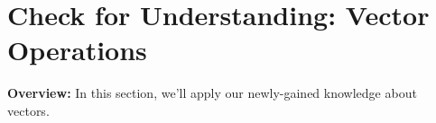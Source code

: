 \section{Check for Understanding: Vector Operations}

\begin{overview}

\textbf{Overview:} In this section, we'll apply our newly-gained knowledge about vectors.

\end{overview}

\label{act6.1.3}

\begin{fnt}
	
\end{fnt}

\vspace{-10pt}
\WCD
\vspace{3pt}

\begin{fnt}
	
\end{fnt}

\vspace{-10pt}
\WCD

\begin{fnt}
	
\end{fnt}

\vspace{-10pt}
\WCD
\vspace{3pt}

\begin{fnt}
	
\end{fnt}

\vspace{-10pt}
\WCD